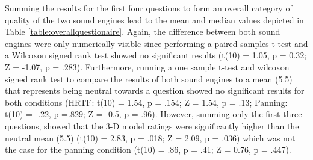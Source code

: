 \documentclass[journal]{IEEEtran}
\begin{document}
Summing the results for the first four questions to form an overall category of quality of the two sound engines lead to the mean and median values depicted in Table \ref{table:overallquestionaire}. Again, the difference between both sound engines were only numerically visible since performing a paired samples t-test and a Wilcoxon signed rank test showed no significant results  (t(10) = 1.05, p = 0.32; Z = -1.07, p = .283). Furthermore, running a one sample t-test and wilcoxon signed rank test to compare the results of both sound engines to a mean (5.5) that represents being neutral towards a question showed no significant results for both conditions (HRTF: t(10) = 1.54, p = .154; Z = 1.54, p = .13; Panning: t(10) = -.22, p =.829; Z = -0.5, p = .96). However, summing only the first three questions, showed that the 3-D model ratings were significantly higher than the neutral mean (5.5) (t(10) = 2.83, p = .018; Z = 2.09, p = .036) which was not the case for the panning condition (t(10) = .86, p = .41; Z = 0.76, p = .447).


%
%

%
%
%
%
\end{document}
